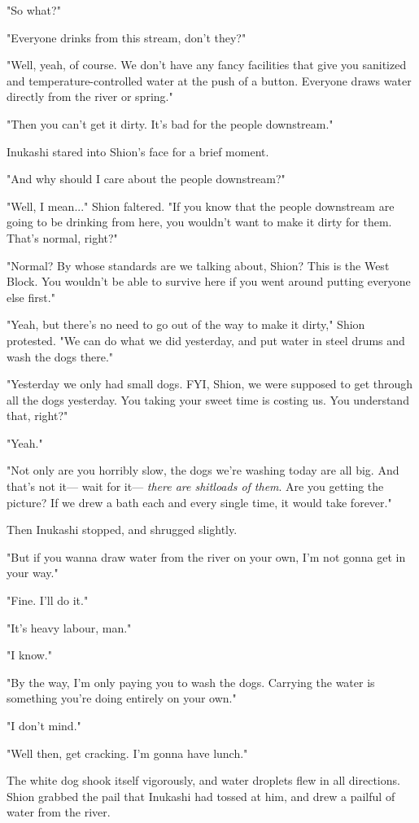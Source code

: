 "So what?"

"Everyone drinks from this stream, don't they?"

"Well, yeah, of course. We don't have any fancy facilities that give you
sanitized and temperature-controlled water at the push of a button.
Everyone draws water directly from the river or spring."

"Then you can't get it dirty. It's bad for the people downstream."

Inukashi stared into Shion's face for a brief moment.

"And why should I care about the people downstream?"

"Well, I mean..." Shion faltered. "If you know that the people
downstream are going to be drinking from here, you wouldn't want to make
it dirty for them. That's normal, right?"

"Normal? By whose standards are we talking about, Shion? This is the
West Block. You wouldn't be able to survive here if you went around
putting everyone else first."

"Yeah, but there's no need to go out of the way to make it dirty," Shion
protested. "We can do what we did yesterday, and put water in steel
drums and wash the dogs there."

"Yesterday we only had small dogs. FYI, Shion, we were supposed to get
through all the dogs yesterday. You taking your sweet time is costing
us. You understand that, right?"

"Yeah."

"Not only are you horribly slow, the dogs we're washing today are all
big. And that's not it--- wait for it--- \emph{there are shitloads of them}. Are
you getting the picture? If we drew a bath each and every single time,
it would take forever."

Then Inukashi stopped, and shrugged slightly.

"But if you wanna draw water from the river on your own, I'm not gonna
get in your way."

"Fine. I'll do it."

"It's heavy labour, man."

"I know."

"By the way, I'm only paying you to wash the dogs. Carrying the water is
something you're doing entirely on your own."

"I don't mind."

"Well then, get cracking. I'm gonna have lunch."

The white dog shook itself vigorously, and water droplets flew in all
directions. Shion grabbed the pail that Inukashi had tossed at him, and
drew a pailful of water from the river.

